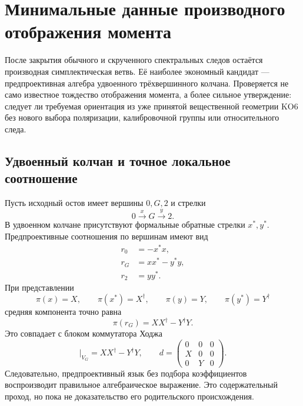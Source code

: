 \chapter{Минимальные данные производного отображения момента}

После закрытия обычного и скрученного спектральных следов остаётся
производная симплектическая ветвь. Её наиболее экономный кандидат ---
предпроективная алгебра удвоенного трёхвершинного колчана. Проверяется не
само известное тождество отображения момента, а более сильное утверждение:
следует ли требуемая ориентация из уже принятой вещественной геометрии KO6
без нового выбора поляризации, калибровочной группы или относительного
следа.

\section{Удвоенный колчан и точное локальное соотношение}

Пусть исходный остов имеет вершины \(0,G,2\) и стрелки
\begin{equation}
 0\xrightarrow{x}G\xrightarrow{y}2.
\end{equation}
В удвоенном колчане присутствуют формальные обратные стрелки \(x^*,y^*\).
Предпроективные соотношения по вершинам имеют вид
\begin{align}
 r_0&=-x^*x,\\
 r_G&=xx^*-y^*y,\\
 r_2&=yy^*.
 \label{eq:v5-derived-preprojective-relations}
\end{align}
При представлении
\begin{equation}
 \pi(x)=X,\qquad \pi(x^*)=X^\dagger,\qquad
 \pi(y)=Y,\qquad \pi(y^*)=Y^\dagger
\end{equation}
средняя компонента точно равна
\begin{equation}
 \boxed{\pi(r_G)=XX^\dagger-Y^\dagger Y.}
 \label{eq:v5-derived-exact-middle-relation}
\end{equation}
Это совпадает с блоком коммутатора Ходжа
\begin{equation}
 [d,d^\dagger]\big|_{V_G}=XX^\dagger-Y^\dagger Y,\qquad
 d=\begin{pmatrix}0&0&0\\X&0&0\\0&Y&0\end{pmatrix}.
\end{equation}
Следовательно, предпроективный язык без подбора коэффициентов воспроизводит
правильное алгебраическое выражение. Это содержательный проход, но пока не
доказательство его родительского происхождения.

